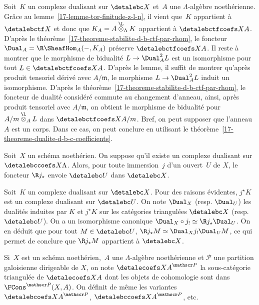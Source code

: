 \documentclass[10pt]{../fichiers-configuration-latex/smfart}
\begin{document}
\bigskip

Soit $K$ un
complexe dualisant sur $\detalebc X$ et $A$ une $\Lambda$-algèbre noethérienne.
Grâce au lemme~\ref{17-lemme-tor-finitude-z-l-n}, il vient que $K$ appartient
à $\detalebctf X$ et donc que
$K_A=A\overset{\L}\otimes_\Lambda K$ appartient
à $\detalebctfcoefs X A$. D'après le
théorème~\ref{17-theoreme-stabilite-d-b-ctf-par-rhom}, le foncteur
$\Dual_A=\R\SheafHom_A(-,K_A)$ préserve $\detalebctfcoefs X A$. Il reste à
montrer que le morphisme de bidualité $L\to \Dual_A^2 L$ est un
isomorphisme pour tout $L\in\detalebctfcoefs X A$.
D'après le lemme, il suffit de
montrer qu'après produit tensoriel dérivé avec $A/\mathfrak m$, le
morphisme $L\to\Dual_A^2 L$ induit un isomorphisme. D'après le
théorème~\ref{17-theoreme-stabilite-d-b-ctf-par-rhom}, le foncteur de dualité
considéré commute au changement d'anneau, ainsi, après produit tensoriel
avec $A/\mathfrak m$, on obtient le morphisme de bidualité pour
$A/\mathfrak m\overset{\L}\otimes_A L$ dans $\detalebctfcoefs X
{A/\mathfrak m}$. Bref, on peut supposer que l'anneau $A$ est un corps.
Dans ce cas, on peut conclure en utilisant le
théorème~\ref{17-theoreme-dualite-d-b-c-coefficients}.

\begin{proposition2}\label{17-proposition-r-j-star-preserve-d-b-c-si-cplx-dualisant}
Soit $X$ un schéma noethérien. On suppose qu'il existe un complexe
dualisant sur $\detalebccoefs X \Lambda$. Alors, pour toute immersion $j$ d'un
ouvert $U$ de $X$, le foncteur $\R j_\star$ envoie
$\detalebc U $ dans $\detalebc X$.
\end{proposition2}

Soit $K$ un complexe dualisant sur $\detalebc X$. Pour des raisons
évidentes, $j^\star K$ est un complexe dualisant sur $\detalebc U$.
On note $\Dual_X$ (resp. $\Dual_U$) les dualités induites par $K$
et $j^\star K$ sur les catégories triangulées $\detalebc X $ (resp.
$\detalebc U $). On a un isomorphisme canonique $\Dual_X\circ
j_!\simeq \R j_\star \Dual_U$. On en déduit que pour tout
$M\in\detalebc U $, $\R j_\star M\simeq \Dual_Xj_!\Dual_U M$,
ce qui permet de conclure que $\R j_\star M$ appartient à $\detalebc X$.

\begin{definition2}
Si $X$ est un schéma noethérien, $A$ une $\Lambda$-algèbre noethérienne
et $\mathscr P$
une partition galoisienne dirigeable de $X$, on note
${\detalecoefs X A}^{\mathscr P}$ la sous-catégorie triangulée de
$\detalecoefs X A$
dont les objets de cohomologie sont dans $\FCons^{\mathscr P}(X,A)$. On
définit de même les variantes ${\detalebcoefs X A}^{\mathscr P}$,
${\detalebccoefs X A}^{\mathscr P}$, etc.
\end{definition2}
\end{document}
